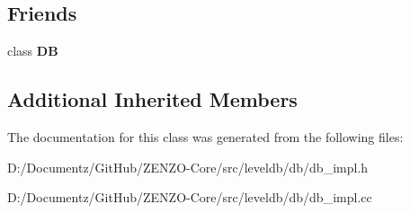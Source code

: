\subsection*{Friends}
\begin{DoxyCompactItemize}
\item 
\mbox{\label{classleveldb_1_1_d_b_impl_ad22eb7a23cbf34de526efa966c578d4a}} 
class {\bfseries DB}
\end{DoxyCompactItemize}
\subsection*{Additional Inherited Members}


The documentation for this class was generated from the following files\+:\begin{DoxyCompactItemize}
\item 
D\+:/\+Documentz/\+Git\+Hub/\+Z\+E\+N\+Z\+O-\/\+Core/src/leveldb/db/db\+\_\+impl.\+h\item 
D\+:/\+Documentz/\+Git\+Hub/\+Z\+E\+N\+Z\+O-\/\+Core/src/leveldb/db/db\+\_\+impl.\+cc\end{DoxyCompactItemize}
